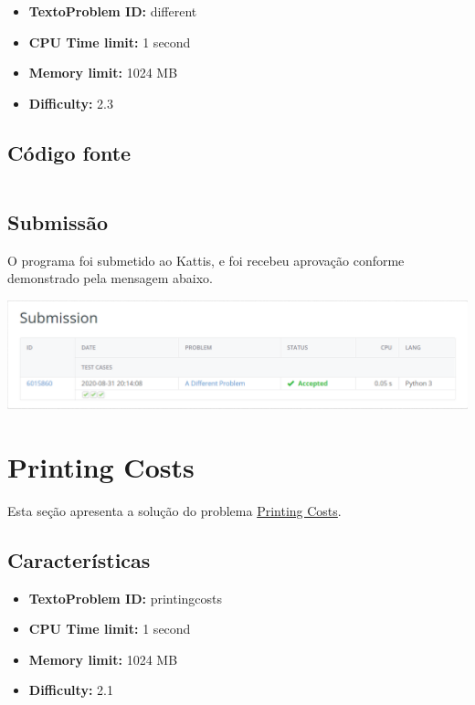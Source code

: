 \documentclass[11pt,a4paper]{scrreprt}
\begin{document}
\begin{itemize}
    \item\textbf{TextoProblem ID: } different
    \item\textbf{CPU Time limit: } 1 second
    \item\textbf{Memory limit: } 1024 MB
    \item\textbf{Difficulty: }  2.3
\end{itemize}

\subsection{Código fonte}

\inputminted[linenos]{python}{src/ADifferentProblem.py}

\subsection{Submissão}
O programa foi submetido ao Kattis, e foi recebeu aprovação conforme demonstrado pela mensagem abaixo.

\includegraphics[scale=0.47]{img/different.png}

\section{Printing Costs}

Esta seção apresenta a solução do problema \href{https://open.kattis.com/problems/printingcosts}{Printing Costs}.

\subsection{Características}

\begin{itemize}
    \item\textbf{TextoProblem ID: } printingcosts
    \item\textbf{CPU Time limit: } 1 second
    \item\textbf{Memory limit: } 1024 MB
    \item\textbf{Difficulty: }  2.1
\end{itemize}
\end{document}
